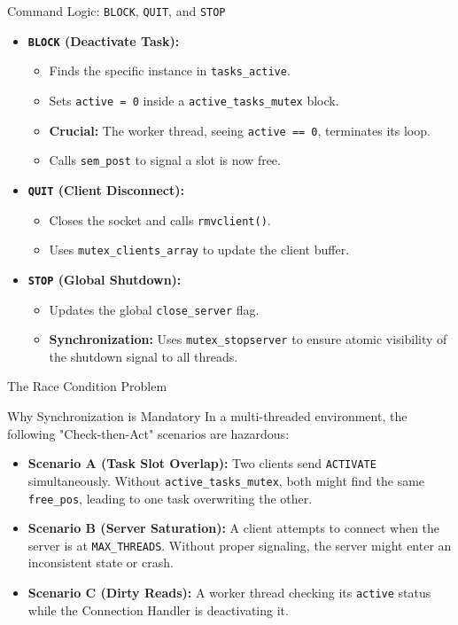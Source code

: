 \begin{frame}{Command Logic: \texttt{BLOCK}, \texttt{QUIT}, and \texttt{STOP}}
    \begin{itemize}
        \item \textbf{\texttt{BLOCK} (Deactivate Task):}
        \begin{itemize}
            \item Finds the specific instance in \texttt{tasks\_active}.
            \item Sets \texttt{active = 0} inside a \texttt{active\_tasks\_mutex} block.
            \item \textbf{Crucial:} The worker thread, seeing \texttt{active == 0}, terminates its loop.
            \item Calls \texttt{sem\_post} to signal a slot is now free.
        \end{itemize}
        \item \textbf{\texttt{QUIT} (Client Disconnect):}
        \begin{itemize}
            \item Closes the socket and calls \texttt{rmvclient()}.
            \item Uses \texttt{mutex\_clients\_array} to update the client buffer.
        \end{itemize}
        \item \textbf{\texttt{STOP} (Global Shutdown):}
        \begin{itemize}
            \item Updates the global \texttt{close\_server} flag.
            \item \textbf{Synchronization:} Uses \texttt{mutex\_stopserver} to ensure atomic visibility of the shutdown signal to all threads.
        \end{itemize}
    \end{itemize}
\end{frame}

\begin{frame}{The Race Condition Problem}
    \begin{alertblock}{Why Synchronization is Mandatory}
        In a multi-threaded environment, the following "Check-then-Act" scenarios are hazardous:
    \end{alertblock}
    \begin{itemize}
        \item \textbf{Scenario A (Task Slot Overlap):} Two clients send \texttt{ACTIVATE} simultaneously. Without \texttt{active\_tasks\_mutex}, both might find the same \texttt{free\_pos}, leading to one task overwriting the other.
        \item \textbf{Scenario B (Server Saturation):} A client attempts to connect when the server is at \texttt{MAX\_THREADS}. Without proper signaling, the server might enter an inconsistent state or crash.
        \item \textbf{Scenario C (Dirty Reads):} A worker thread checking its \texttt{active} status while the Connection Handler is deactivating it.
    \end{itemize}
\end{frame}

